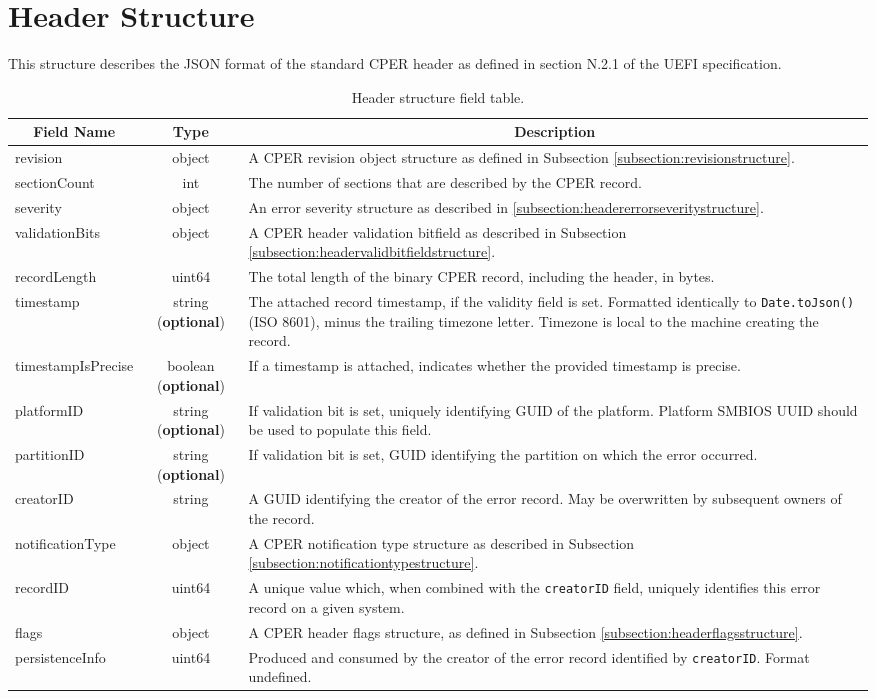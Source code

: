 \documentclass{report}
\newcommand*{\thead}[1]{\multicolumn{1}{|c|}{\bfseries #1}}
\newcommand*{\jsontable}[1]{
    \begin{table}[!ht]
    \label{#1}
    \centering
    \begin{adjustbox}{center}
    \begin{tabular}{|l|c|p{8cm}|}
    \hline
    \thead{Field Name} & \thead{Type} & \thead{Description} \\
    \hline
}
\newcommand*{\jsontableend}[1]{
    \hline
    \end{tabular}
    \end{adjustbox}
    \caption{#1}
    \label{table:#1}
    \end{table}
    \FloatBarrier
}
\begin{document}
\section{Header Structure}
\label{section:headerstructure}
This structure describes the JSON format of the standard CPER header as defined in section N.2.1 of the
UEFI specification.

\jsontable{table:headerstructure}
revision & object & A CPER revision object structure as defined in Subsection \ref{subsection:revisionstructure}. \\
\hline
sectionCount & int & The number of sections that are described by the CPER record.\\
\hline
severity & object & An error severity structure as described in \ref{subsection:headererrorseveritystructure}.\\
\hline
validationBits & object & A CPER header validation bitfield as described in Subsection \ref{subsection:headervalidbitfieldstructure}.\\
\hline
recordLength & uint64 & The total length of the binary CPER record, including the header, in bytes.\\
\hline
timestamp & string (\textbf{optional}) & The attached record timestamp, if the validity field is set. Formatted identically to \texttt{Date.toJson()} (ISO 8601), minus the trailing timezone letter. Timezone is local to the machine creating the record.\\
\hline
timestampIsPrecise & boolean (\textbf{optional}) & If a timestamp is attached, indicates whether the provided timestamp is precise.\\
\hline
platformID & string (\textbf{optional}) & If validation bit is set, uniquely identifying GUID of the platform. Platform SMBIOS UUID should be used to populate this field.\\
\hline
partitionID & string (\textbf{optional}) & If validation bit is set, GUID identifying the partition on which the error occurred.\\
\hline
creatorID & string & A GUID identifying the creator of the error record. May be overwritten by subsequent owners of the record.\\
\hline
notificationType & object & A CPER notification type structure as described in Subsection \ref{subsection:notificationtypestructure}.\\
\hline
recordID & uint64 & A unique value which, when combined with the \texttt{creatorID} field, uniquely identifies this error record on a given system.\\
\hline
flags & object & A CPER header flags structure, as defined in Subsection \ref{subsection:headerflagsstructure}.\\
\hline
persistenceInfo & uint64 & Produced and consumed by the creator of the error record identified by \texttt{creatorID}. Format undefined.\\
\jsontableend{Header structure field table.}
\end{document}

